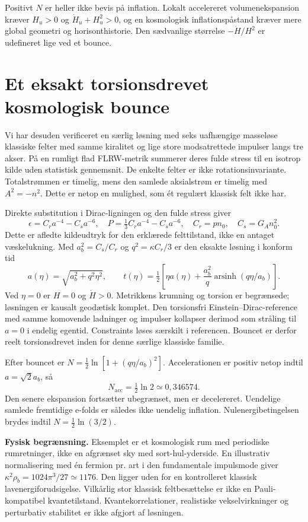 \documentclass[11pt,a4paper]{article}
\begin{document}
Positivt $N$ er heller ikke bevis på inflation. Lokalt accelereret volumenekspansion kræver $H_u>0$ og $\dot H_u+H_u^2>0$, og en kosmologisk inflationspåstand kræver mere global geometri og horisonthistorie. Den sædvanlige størrelse $-\dot H/H^2$ er udefineret lige ved et bounce.

\section{Et eksakt torsionsdrevet kosmologisk bounce}
Vi har desuden verificeret en særlig løsning med seks uafhængige masseløse klassiske felter med samme kiralitet og lige store modsatrettede impulser langs tre akser. På en rumligt flad FLRW-metrik summerer deres fulde stress til en isotrop kilde uden statistisk gennemsnit. De enkelte felter er ikke rotationsinvariante. Totalstrømmen er timelig, mens den samlede aksialstrøm er timelig med $A^2=-n^2$. Dette er netop en mulighed, som ét regulært klassisk felt ikke har.

Direkte substitution i Dirac-ligningen og den fulde stress giver
\[
 \epsilon=C_r a^{-4}-C_s a^{-6},\quad
 P=\tfrac13 C_r a^{-4}-C_s a^{-6},\quad
 C_r=pn_0,\quad C_s=G_A n_0^2.
\]
Dette er afledte kildeudtryk for den erklærede felttilstand, ikke en antaget væskelukning. Med $a_b^2=C_s/C_r$ og $q^2=\kappa C_r/3$ er den eksakte løsning i konform tid
\[
 \boxed{a(\eta)=\sqrt{a_b^2+q^2\eta^2}},\qquad
 t(\eta)=\tfrac12\left[\eta a(\eta)+\frac{a_b^2}{q}
 \operatorname{arsinh}(q\eta/a_b)\right].
\]
Ved $\eta=0$ er $H=0$ og $\dot H>0$. Metrikkens krumning og torsion er begrænsede; løsningen er kausalt geodætisk komplet. Den torsionsfri Einstein--Dirac-reference med samme komovende ladninger og impulser kollapser derimod som stråling til $a=0$ i endelig egentid. Constraints løses særskilt i referencen. Bouncet er derfor reelt torsionsdrevet inden for denne særlige klassiske familie.

Efter bouncet er $N=\tfrac12\ln[1+(q\eta/a_b)^2]$. Accelerationen er positiv netop indtil $a=\sqrt2 a_b$, så
\[
 \boxed{N_{\mathrm{acc}}=\tfrac12\ln2\simeq0{,}346574.}
\]
Den senere ekspansion fortsætter ubegrænset, men er decelereret. Uendelige samlede fremtidige e-folds er således ikke uendelig inflation. Nulenergibetingelsen brydes indtil $N=\tfrac12\ln(3/2)$.

\textbf{Fysisk begrænsning.} Eksemplet er et kosmologisk rum med periodiske rumretninger, ikke en afgrænset sky med sort-hul-yderside. En illustrativ normalisering med én fermion pr. art i den fundamentale impulsmode giver $\kappa^2\rho_b=1024\pi^3/27\simeq1176$. Den ligger uden for en kontrolleret klassisk lavenergiforudsigelse. Vilkårlig stor klassisk feltbesættelse er ikke en Pauli-kompatibel kvantetilstand. Kvantekorrelationer, realistiske vekselvirkninger og perturbativ stabilitet er ikke afgjort af løsningen.
\end{document}
